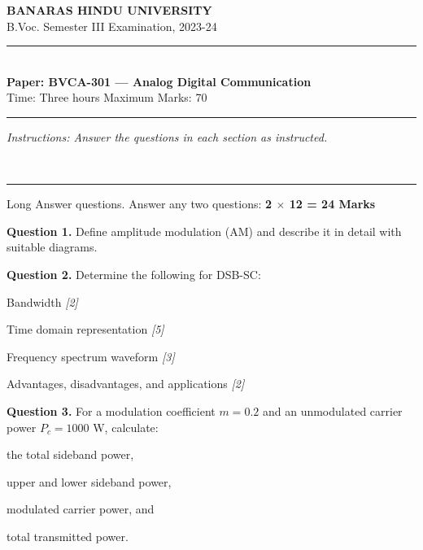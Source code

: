 \documentclass[11pt,a4paper]{article}
\newcommand{\pts}[1]{\hfill   \textit{[#1]}}
\begin{document}
\begin{center}
  {\large\bfseries BANARAS HINDU UNIVERSITY}\\[2pt]
  {\normalsize B.Voc. Semester III Examination, 2023-24}\\[6pt]
  \rule{0.8\linewidth}{0.5pt}\\[6pt]
  {\large\bfseries Paper: BVCA-301 --- Analog Digital Communication}\\[4pt]
  {\normalsize Time: Three hours \hfill Maximum Marks: 70}
\end{center}

\rule{\linewidth}{0.4pt}

\smallskip



\noindent   \textit{Instructions: Answer the questions in each section as instructed.}

\bigskip




\\[4pt]
\rule{\linewidth}{0.4pt}\smallskip

Long Answer questions. Answer any two questions: \hfill   \textbf{2 $ \times$ 12 = 24 Marks}

\medskip



\noindent   \textbf{Question 1.} Define amplitude modulation (AM) and describe it in detail with suitable diagrams.

\medskip



\noindent   \textbf{Question 2.} Determine the following for DSB-SC:

\begin{parts}
  \item Bandwidth \pts{2}
  \item Time domain representation \pts{5}
  \item Frequency spectrum waveform \pts{3}
  \item Advantages, disadvantages, and applications \pts{2}
\end{parts}

\medskip



\noindent   \textbf{Question 3.} For a modulation coefficient $m = 0.2$ and an unmodulated carrier power $P_c = 1000$ W, calculate:

\begin{parts}
  \item the total sideband power,
  \item upper and lower sideband power,
  \item modulated carrier power, and
  \item total transmitted power.
\end{parts}
\end{document}
